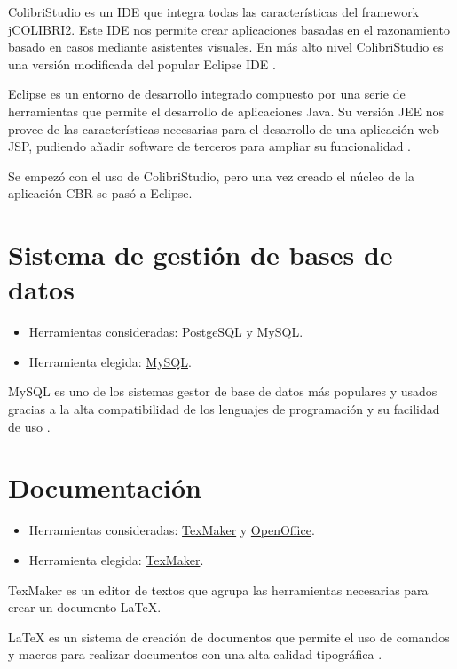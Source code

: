 ColibriStudio es un IDE que integra todas las características del framework jCOLIBRI2. Este IDE nos permite crear aplicaciones basadas en el razonamiento basado en casos mediante asistentes visuales. En más alto nivel ColibriStudio es una versión modificada del popular Eclipse IDE \cite{colibri:studio}.

Eclipse es un entorno de desarrollo integrado compuesto por una serie de herramientas que permite el desarrollo de aplicaciones Java. Su versión JEE nos provee de las características necesarias para el desarrollo de una aplicación web JSP, pudiendo añadir software de terceros para ampliar su funcionalidad \cite{eclipse:info}.

Se empezó con el uso de ColibriStudio, pero una vez creado el núcleo de la aplicación CBR se pasó a Eclipse.

\section{Sistema de gestión de bases de datos}

\begin{itemize}
\tightlist
\item
  Herramientas consideradas: \href{http://www.postgresql.org.es/}{PostgeSQL} y \href{https://www.mysql.com/}{MySQL}.
\item
  Herramienta elegida: \href{https://www.mysql.com/}{MySQL}.
\end{itemize}

MySQL es uno de los sistemas gestor de base de datos más populares y usados gracias a la alta compatibilidad de los lenguajes de programación y su facilidad de uso \cite{mysql:wiki}.

\section{Documentación}

\begin{itemize}
\tightlist
\item
  Herramientas consideradas: \href{http://www.xm1math.net/texmaker/}{TexMaker} y \href{https://www.openoffice.org/es/}{OpenOffice}.
\item
  Herramienta elegida: \href{http://www.xm1math.net/texmaker/}{TexMaker}.
\end{itemize}

TexMaker es un editor de textos que agrupa las herramientas necesarias para crear un documento LaTeX.

LaTeX es un sistema de creación de documentos que permite el uso de comandos y macros para realizar documentos con una alta calidad tipográfica \cite{latex:wiki}.

